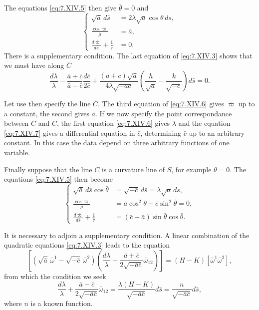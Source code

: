 \documentclass[leqno,11pt]{book}
\numberwithin{equation}{chapter}
\theoremstyle{shape1}
\theoremstyle{shape0}
\theoremstyle{shape2}
\theoremstyle{definition}
\begin{document}
The equations \eqref{eq:7.XIV.5} then give $\bar\theta=0$ and
\begin{equation}
  \label{eq:7.XIV.6}\tag{XIV, 6}
  \left\{
    \begin{aligned}
      \sqrt{\bar a}\,d\bar s&=2\lambda\sqrt{a}\cos\theta\, ds,\\
      \frac{\cos\bar\varpi}{\bar\rho}&=\bar a,\\
      \frac{d\bar\varpi}{d\bar s}+\frac{1}{\bar\tau}&=0.
    \end{aligned}
  \right.
\end{equation}
There is a supplementary condition. The last equation of \eqref{eq:7.XIV.3} shows that we must have along $\bar C$
\begin{equation}
  \label{eq:7.XIV.7}\tag{XIV, 7}
  \frac{d\lambda}{\lambda}-\frac{\bar a+\bar c}{\bar a-\bar c}\frac{d\bar c}{2\bar c}+\frac{(a+c)\sqrt{\bar a}}{4\lambda\sqrt{-ac}}\left(\frac{h}{\sqrt{a}}-\frac{k}{\sqrt{-c}}\right)d\bar s=0.
\end{equation}

Let use then specify the line $\bar C$. The third equation of \eqref{eq:7.XIV.6} gives $\bar\varpi$ up to a constant, the second gives $\bar a$. If we now specify  the point correspondance between $\bar C$ and $C$, the first equation \eqref{eq:7.XIV.6} gives $\lambda$ and the equation \eqref{eq:7.XIV.7} gives a differential equation in $\bar c$, determining $\bar c$ up to an arbitrary constant. In this case the data depend on three arbitrary functions of one variable.

Finally suppose that the line $C$ is a curvature line of $S$, for example $\theta=0$. The equations \eqref{eq:7.XIV.5} then become
\begin{equation}
  \label{eq:7.XIV.8}\tag{XIV, 8}
  \left\{
    \begin{aligned}
      \sqrt{\bar a}\,d\bar s\cos\bar\theta&=\sqrt{-\bar c}\,d\bar s=\lambda\sqrt{a}\,ds,\\
      \frac{\cos\bar\varpi}{\bar\rho}&=\bar a\cos^{2}\theta+\bar c\sin^{2}\bar\theta=0,\\
      \frac{d\bar\varpi}{d\bar s}+\frac{1}{\bar\tau}&=(\bar c-\bar a)\sin\bar\theta\cos\bar\theta.
    \end{aligned}
  \right.
\end{equation}

It is necessary to adjoin a supplementary condition. A linear combination of the quadratic equations \eqref{eq:7.XIV.3} leads to the equation
\[
\left[(\sqrt{\bar a}\,\bar\omega^{1}-\sqrt{-\bar c}\,\bar\omega^{2})\left(\frac{d\lambda}{\lambda}+\frac{\bar a+\bar c}{2\sqrt{-\bar{a}\bar{c}}}\bar \omega_{12}\right)\right]=(H-K)[\bar\omega^{1}\bar\omega^{2}],
\]
from which the condition we seek
\begin{equation}
  \label{eq:7.XIV.9}\tag{XIV, 9}
  \frac{d\lambda}{\lambda}+\frac{\bar a-\bar c}{2\sqrt{-\bar{a}\bar{c}}}\bar\omega_{12}=\frac{\lambda(H-K)}{\sqrt{-\bar{a}\bar{c}}}d\bar s=\frac{n}{\sqrt{-\bar{a}\bar{c}}}d\bar s,
\end{equation}
where $n$ is a known function.
\end{document}
